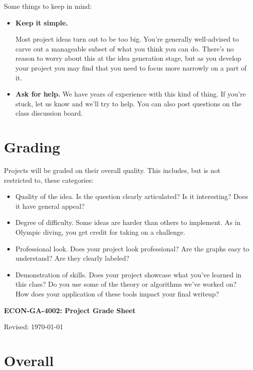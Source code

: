 \documentclass[11pt]{article}
\begin{document}
Some things to keep in mind:
%
\begin{itemize}
\item {\bf Keep it simple.}

Most project ideas turn out to be too big.  You're generally well-advised to
carve out a manageable subset of what you think you can do. There's no reason to
worry about this at the idea generation stage, but as you develop your project
you may find that you need to focus more narrowly on a part of it.

\item {\bf Ask for help.}
We have years of experience with this kind of thing. If you're stuck, let us
know and we'll try to help. You can also post questions on the class discussion
board.

\end{itemize}


\section*{Grading}

Projects will be graded on their overall quality.  This includes, but is not
restricted to, these categories:
%
\begin{itemize}
\item Quality of the idea.  Is the question clearly articulated?  Is it
interesting? Does it have general appeal?
\item Degree of difficulty. Some ideas are harder than others to implement. As
in Olympic diving, you get credit for taking on a challenge.
\item Professional look.  Does your project look professional?  Are the graphs
easy to understand?  Are they clearly labeled?
\item Demonstration of skills. Does your project showcase what you've learned in
this class? Do you use some of the theory or algorithms we've worked on? How
does your application of these tools impact your final writeup?
\end{itemize}



\pagebreak
\thispagestyle{empty}

\bigskip\bigskip
\centerline{\Large \bf ECON-GA-4002:  Project Grade Sheet}
\centerline{Revised: \today}


\section*{Overall}
\end{document}
